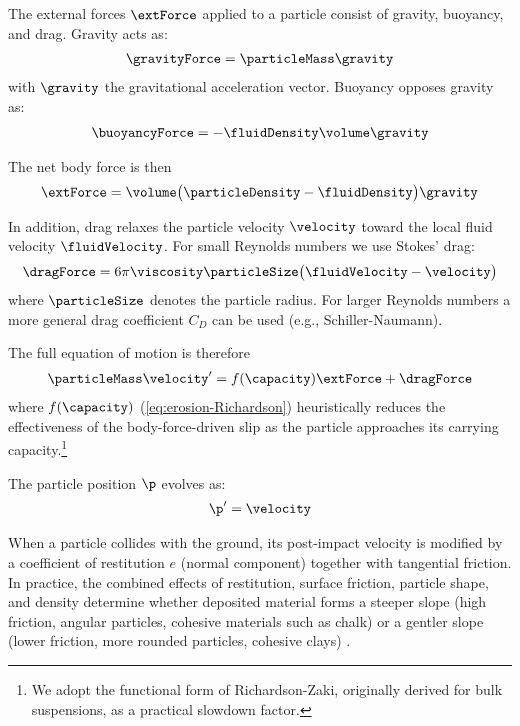 The external forces $\extForce$ applied to a particle consist of gravity, buoyancy, and drag. Gravity acts as:
\begin{align}
    \gravityForce = \particleMass \gravity
\end{align}
with $\gravity$ the gravitational acceleration vector. Buoyancy opposes gravity as:
\begin{align}
    \buoyancyForce = -\fluidDensity \volume \gravity
\end{align}

The net body force is then
\begin{align}
\label{eq:erosion-bodyforce}
    \extForce = \volume \big(\particleDensity - \fluidDensity\big)\gravity
\end{align}

In addition, drag relaxes the particle velocity $\velocity$ toward the local fluid velocity $\fluidVelocity$. For small Reynolds numbers we use Stokes’ drag:
\begin{align}
    \label{eq:erosion-drag}
    \dragForce = 6\pi \viscosity \particleSize \big(\fluidVelocity - \velocity\big)
\end{align}
where $\particleSize$ denotes the particle radius. For larger Reynolds numbers a more general drag coefficient $C_D$ can be used (e.g., Schiller-Naumann).

The full equation of motion is therefore
\begin{align}
    \label{eq:erosion-ode}
    \particleMass  \velocity' = f(\capacity)\extForce + \dragForce
\end{align}
where $f(\capacity)$ (\cref{eq:erosion-Richardson}) heuristically reduces the effectiveness of the body-force-driven slip as the particle approaches its carrying capacity.\footnote{We adopt the functional form of Richardson-Zaki, originally derived for bulk suspensions, as a practical slowdown factor.}

The particle position $\p$ evolves as:
\begin{align}
    \label{eq:erosion-kinematics}
    \p' = \velocity
\end{align}

When a particle collides with the ground, its post-impact velocity is modified by a coefficient of restitution $e$ (normal component) together with tangential friction. In practice, the combined effects of restitution, surface friction, particle shape, and density determine whether deposited material forms a steeper slope (high friction, angular particles, cohesive materials such as chalk) or a gentler slope (lower friction, more rounded particles, cohesive clays) \cite{Yan2020}.


